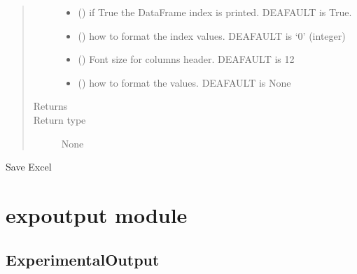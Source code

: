 \documentclass[letterpaper,10pt,english]{sphinxmanual}
\begin{document}
\begin{fulllineitems}
\begin{fulllineitems}
\begin{quote}
\begin{description}
\begin{itemize}
\item {} 
 () \textendash{} if True the DataFrame index is printed. DEAFAULT is True.

\item {} 
 () \textendash{} how to format the index values. DEAFAULT is ‘0’ (integer)

\item {} 
 () \textendash{} Font size for columns header. DEAFAULT is 12

\item {} 
 () \textendash{} how to format the values. DEAFAULT is None

\end{itemize}

\item[{Returns}] \leavevmode


\item[{Return type}] \leavevmode
None

\end{description}\end{quote}

\end{fulllineitems}


\begin{fulllineitems}
\label{\detokenize{api/postprocessing:output.ExcelOutputSheet.save}}
Save Excel

\end{fulllineitems}


\end{fulllineitems}



\section{expoutput module}
\label{\detokenize{api/postprocessing:expoutput-module}}

\subsection{ExperimentalOutput}
\label{\detokenize{api/postprocessing:experimentaloutput}}\label{\detokenize{api/postprocessing:expoutputclass}}
\end{document}
